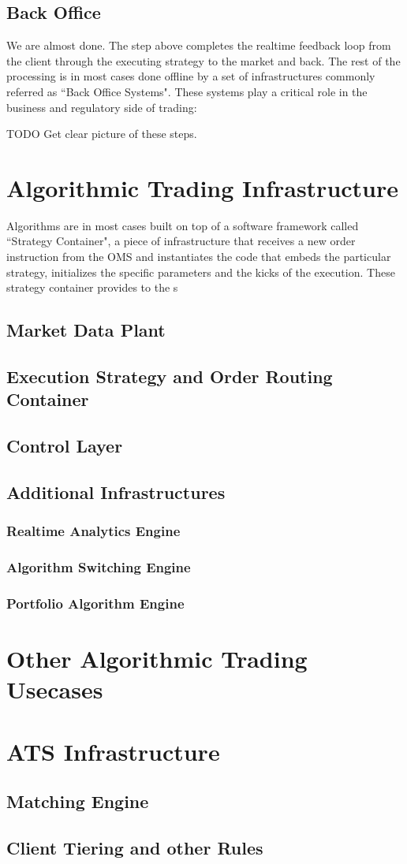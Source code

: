 \subsection{Back Office}
We are almost done. The step above completes the realtime feedback loop from the client through the executing strategy to the market and back. The rest of the processing is in most cases done offline by a set of infrastructures commonly referred as ``Back Office Systems". These systems play a critical role in the business and regulatory side of trading:

TODO Get clear picture of these steps.

\section{Algorithmic Trading Infrastructure}
Algorithms are in most cases built on top of a software framework called ``Strategy Container", a piece of infrastructure that receives a new order instruction from the OMS and instantiates the code that embeds the particular strategy, initializes the specific parameters and the kicks of the execution. These strategy container provides to the s
\subsection{Market Data Plant}
\subsection{Execution Strategy and Order  Routing Container}
\subsection{Control Layer}
\subsection{Additional Infrastructures}
\subsubsection{Realtime Analytics Engine}
\subsubsection{Algorithm Switching Engine}
\subsubsection{Portfolio Algorithm Engine}

\section{Other Algorithmic Trading Usecases}


\section{ATS Infrastructure}
\subsection{Matching Engine}
\subsection{Client Tiering and other Rules}

